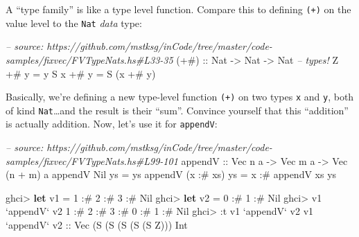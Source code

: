 \documentclass[]{article}
\newenvironment{Shaded}{}{}
\newcommand{\KeywordTok}[1]{\textcolor[rgb]{0.00,0.44,0.13}{\textbf{{#1}}}}
\newcommand{\DataTypeTok}[1]{\textcolor[rgb]{0.56,0.13,0.00}{{#1}}}
\newcommand{\DecValTok}[1]{\textcolor[rgb]{0.25,0.63,0.44}{{#1}}}
\newcommand{\CommentTok}[1]{\textcolor[rgb]{0.38,0.63,0.69}{\textit{{#1}}}}
\newcommand{\OtherTok}[1]{\textcolor[rgb]{0.00,0.44,0.13}{{#1}}}
\newcommand{\FunctionTok}[1]{\textcolor[rgb]{0.02,0.16,0.49}{{#1}}}
\newcommand{\NormalTok}[1]{{#1}}
\begin{document}
A ``type family'' is like a type level function. Compare this to defining
\texttt{(+)} on the value level to the \texttt{Nat} \emph{data} type:

\begin{Shaded}
\begin{Highlighting}[]
\CommentTok{-- source: https://github.com/mstksg/inCode/tree/master/code-samples/fixvec/FVTypeNats.hs#L33-35}
\OtherTok{(+#) ::} \DataTypeTok{Nat} \OtherTok{->} \DataTypeTok{Nat} \OtherTok{->} \DataTypeTok{Nat}       \CommentTok{-- types!}
\DataTypeTok{Z}   \FunctionTok{+#} \NormalTok{y }\FunctionTok{=} \NormalTok{y}
\DataTypeTok{S} \NormalTok{x }\FunctionTok{+#} \NormalTok{y }\FunctionTok{=} \DataTypeTok{S} \NormalTok{(x }\FunctionTok{+#} \NormalTok{y)}
\end{Highlighting}
\end{Shaded}

Basically, we're defining a new type-level function \texttt{(+)} on two types
\texttt{x} and \texttt{y}, both of kind \texttt{Nat}\ldots{}and the result is
their ``sum''. Convince yourself that this ``addition'' is actually addition.
Now, let's use it for \texttt{appendV}:

\begin{Shaded}
\begin{Highlighting}[]
\CommentTok{-- source: https://github.com/mstksg/inCode/tree/master/code-samples/fixvec/FVTypeNats.hs#L99-101}
\OtherTok{appendV ::} \DataTypeTok{Vec} \NormalTok{n a }\OtherTok{->} \DataTypeTok{Vec} \NormalTok{m a }\OtherTok{->} \DataTypeTok{Vec} \NormalTok{(n }\FunctionTok{+} \NormalTok{m) a}
\NormalTok{appendV }\DataTypeTok{Nil}       \NormalTok{ys }\FunctionTok{=} \NormalTok{ys}
\NormalTok{appendV (x }\FunctionTok{:#} \NormalTok{xs) ys }\FunctionTok{=} \NormalTok{x }\FunctionTok{:#} \NormalTok{appendV xs ys}
\end{Highlighting}
\end{Shaded}

\begin{Shaded}
\begin{Highlighting}[]
\NormalTok{ghci}\FunctionTok{>} \KeywordTok{let} \NormalTok{v1 }\FunctionTok{=} \DecValTok{1} \FunctionTok{:#} \DecValTok{2} \FunctionTok{:#} \DecValTok{3} \FunctionTok{:#} \DataTypeTok{Nil}
\NormalTok{ghci}\FunctionTok{>} \KeywordTok{let} \NormalTok{v2 }\FunctionTok{=} \DecValTok{0} \FunctionTok{:#} \DecValTok{1} \FunctionTok{:#} \DataTypeTok{Nil}
\NormalTok{ghci}\FunctionTok{>} \NormalTok{v1 }\OtherTok{`appendV`} \NormalTok{v2}
\DecValTok{1} \FunctionTok{:#} \DecValTok{2} \FunctionTok{:#} \DecValTok{3} \FunctionTok{:#} \DecValTok{0} \FunctionTok{:#} \DecValTok{1} \FunctionTok{:#} \DataTypeTok{Nil}
\NormalTok{ghci}\FunctionTok{>} \FunctionTok{:}\NormalTok{t v1 }\OtherTok{`appendV`} \NormalTok{v2}
\NormalTok{v1 }\OtherTok{`appendV` v2 ::} \DataTypeTok{Vec} \NormalTok{(}\DataTypeTok{S} \NormalTok{(}\DataTypeTok{S} \NormalTok{(}\DataTypeTok{S} \NormalTok{(}\DataTypeTok{S} \NormalTok{(}\DataTypeTok{S} \DataTypeTok{Z}\NormalTok{))) }\DataTypeTok{Int}
\end{Highlighting}
\end{Shaded}
\end{document}
